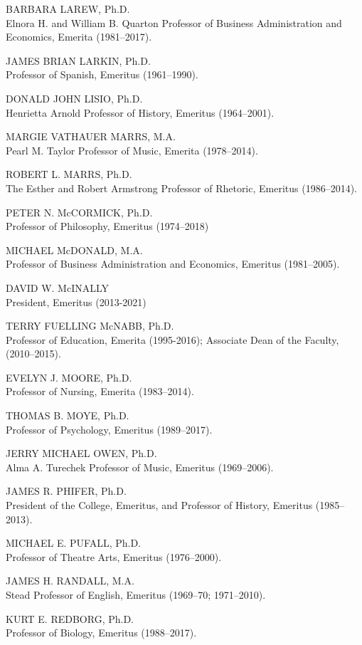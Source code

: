 \documentclass[
  letterpaper,
]{scrbook}
\begin{document}
BARBARA LAREW, Ph.D.\\
Elnora H. and William B. Quarton Professor of Business Administration
and Economics, Emerita (1981--2017).

JAMES BRIAN LARKIN, Ph.D.\\
Professor of Spanish, Emeritus (1961--1990).

DONALD JOHN LISIO, Ph.D.\\
Henrietta Arnold Professor of History, Emeritus (1964--2001).

MARGIE VATHAUER MARRS, M.A.\\
Pearl M. Taylor Professor of Music, Emerita (1978--2014).

ROBERT L. MARRS, Ph.D.\\
The Esther and Robert Armstrong Professor of Rhetoric, Emeritus
(1986--2014).

PETER N. McCORMICK, Ph.D.\\
Professor of Philosophy, Emeritus (1974--2018)

MICHAEL McDONALD, M.A.\\
Professor of Business Administration and Economics, Emeritus
(1981--2005).

DAVID W. McINALLY\\
President, Emeritus (2013-2021)

TERRY FUELLING McNABB, Ph.D.\\
Professor of Education, Emerita (1995-2016); Associate Dean of the
Faculty, (2010--2015).

EVELYN J. MOORE, Ph.D.\\
Professor of Nursing, Emerita (1983--2014).

THOMAS B. MOYE, Ph.D.\\
Professor of Psychology, Emeritus (1989--2017).

JERRY MICHAEL OWEN, Ph.D.\\
Alma A. Turechek Professor of Music, Emeritus (1969--2006).

JAMES R. PHIFER, Ph.D.\\
President of the College, Emeritus, and Professor of History, Emeritus
(1985--2013).

MICHAEL E. PUFALL, Ph.D.\\
Professor of Theatre Arts, Emeritus (1976--2000).

JAMES H. RANDALL, M.A.\\
Stead Professor of English, Emeritus (1969--70; 1971--2010).

KURT E. REDBORG, Ph.D.\\
Professor of Biology, Emeritus (1988--2017).
\end{document}
